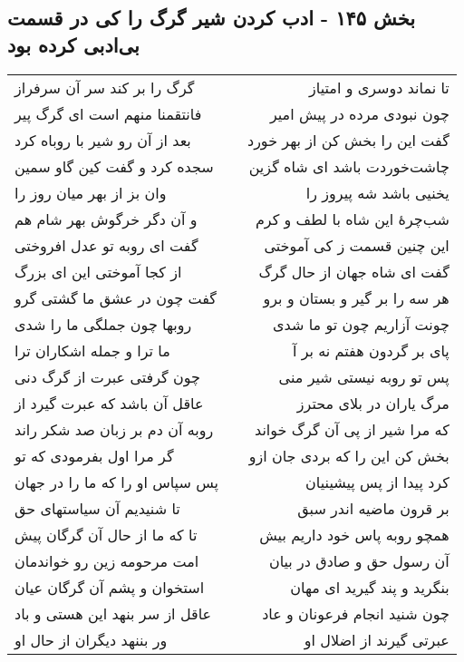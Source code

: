 \begin{center}
\section*{بخش ۱۴۵ - ادب کردن شیر گرگ را کی در قسمت بی‌ادبی کرده بود}
\label{sec:sh145}
\begin{longtable}{l p{0.5cm} r}
گرگ را بر کند سر آن سرفراز
&&
تا نماند دوسری و امتیاز
\\
فانتقمنا منهم است ای گرگ پیر
&&
چون نبودی مرده در پیش امیر
\\
بعد از آن رو شیر با روباه کرد
&&
گفت این را بخش کن از بهر خورد
\\
سجده کرد و گفت کین گاو سمین
&&
چاشت‌خوردت باشد ای شاه گزین
\\
وان بز از بهر میان روز را
&&
یخنیی باشد شه پیروز را
\\
و آن دگر خرگوش بهر شام هم
&&
شب‌چرهٔ این شاه با لطف و کرم
\\
گفت ای روبه تو عدل افروختی
&&
این چنین قسمت ز کی آموختی
\\
از کجا آموختی این ای بزرگ
&&
گفت ای شاه جهان از حال گرگ
\\
گفت چون در عشق ما گشتی گرو
&&
هر سه را بر گیر و بستان و برو
\\
روبها چون جملگی ما را شدی
&&
چونت آزاریم چون تو ما شدی
\\
ما ترا و جمله اشکاران ترا
&&
پای بر گردون هفتم نه بر آ
\\
چون گرفتی عبرت از گرگ دنی
&&
پس تو روبه نیستی شیر منی
\\
عاقل آن باشد که عبرت گیرد از
&&
مرگ یاران در بلای محترز
\\
روبه آن دم بر زبان صد شکر راند
&&
که مرا شیر از پی آن گرگ خواند
\\
گر مرا اول بفرمودی که تو
&&
بخش کن این را که بردی جان ازو
\\
پس سپاس او را که ما را در جهان
&&
کرد پیدا از پس پیشینیان
\\
تا شنیدیم آن سیاستهای حق
&&
بر قرون ماضیه اندر سبق
\\
تا که ما از حال آن گرگان پیش
&&
همچو روبه پاس خود داریم بیش
\\
امت مرحومه زین رو خواندمان
&&
آن رسول حق و صادق در بیان
\\
استخوان و پشم آن گرگان عیان
&&
بنگرید و پند گیرید ای مهان
\\
عاقل از سر بنهد این هستی و باد
&&
چون شنید انجام فرعونان و عاد
\\
ور بننهد دیگران از حال او
&&
عبرتی گیرند از اضلال او
\\
\end{longtable}
\end{center}
